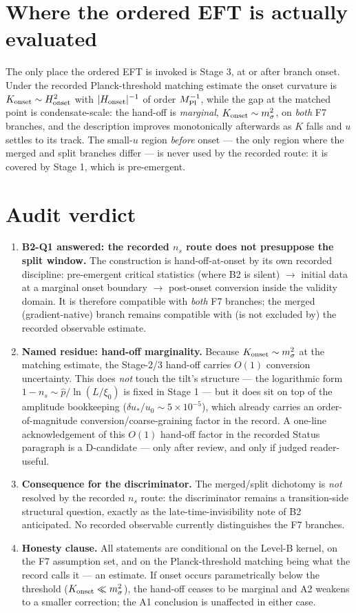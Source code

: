 \documentclass[11pt,a4paper]{article}
\begin{document}
\section{Where the ordered EFT is actually evaluated}
The only place the ordered EFT is invoked is Stage 3, at or after branch
onset. Under the recorded Planck-threshold matching estimate the onset
curvature is $K_{\rm onset}\sim H_{\rm onset}^2$ with
$|H_{\rm onset}|^{-1}$ of order $M_{\rm Pl}^{-1}$, while the gap at the
matched point is condensate-scale: the hand-off is \emph{marginal},
$K_{\rm onset}\sim m_\sigma^2$, on \emph{both} F7 branches, and the
description improves monotonically afterwards as $K$ falls and $u$ settles
to its track. The small-$u$ region \emph{before} onset --- the only region
where the merged and split branches differ --- is never used by the
recorded route: it is covered by Stage 1, which is pre-emergent.

\section{Audit verdict}
\begin{enumerate}[leftmargin=1.9em,itemsep=2pt,label=\textbf{A\arabic*.}]
\item \textbf{B2-Q1 answered: the recorded $n_s$ route does not presuppose
the split window.} The construction is hand-off-at-onset by its own
recorded discipline: pre-emergent critical statistics (where B2 is silent)
$\to$ initial data at a marginal onset boundary $\to$ post-onset conversion
inside the validity domain. It is therefore compatible with \emph{both} F7
branches; the merged (gradient-native) branch remains compatible with
(is not excluded by) the
recorded observable estimate.
\item \textbf{Named residue: hand-off marginality.} Because
$K_{\rm onset}\sim m_\sigma^2$ at the matching estimate, the Stage-2/3
hand-off carries $O(1)$ conversion uncertainty. This does \emph{not}
touch the tilt's structure --- the logarithmic form
$1-n_s\sim\hat p/\ln(L/\xi_0)$ is fixed in Stage 1 --- but it does sit on
top of the amplitude bookkeeping ($\delta u_*/u_0\sim5\times10^{-5}$),
which already carries an order-of-magnitude conversion/coarse-graining
factor in the record. A one-line acknowledgement of this $O(1)$ hand-off
factor in the recorded Status paragraph is a D-candidate --- only after
review, and only if judged reader-useful.
\item \textbf{Consequence for the discriminator.} The merged/split
dichotomy is \emph{not} resolved by the recorded $n_s$ route: the
discriminator remains a transition-side structural question, exactly as
the late-time-invisibility note of B2 anticipated. No recorded observable
currently distinguishes the F7 branches.
\item \textbf{Honesty clause.} All statements are conditional on the
Level-B kernel, on the F7 assumption set, and on the Planck-threshold
matching being what the record calls it --- an estimate. If onset occurs
parametrically below the threshold ($K_{\rm onset}\ll m_\sigma^2$), the
hand-off ceases to be marginal and A2 weakens to a smaller correction;
the A1 conclusion is unaffected in either case.
\end{enumerate}
\end{document}
